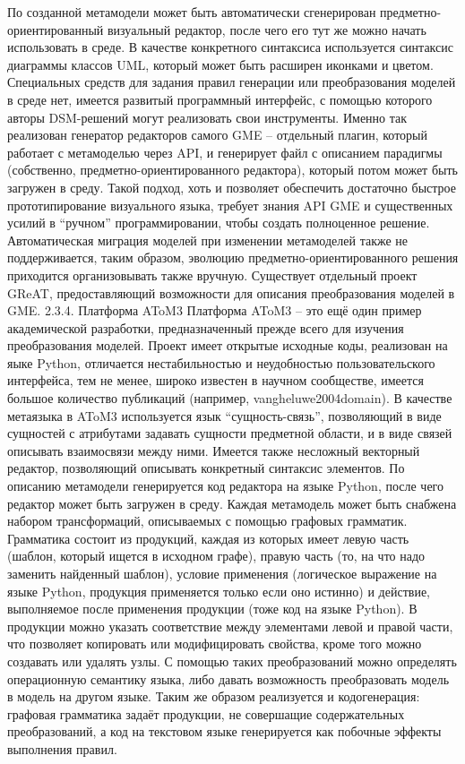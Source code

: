 	По созданной метамодели может быть автоматически сгенерирован предметно-ориентированный визуальный редактор, после чего его тут же можно начать использовать в среде. В качестве конкретного синтаксиса используется синтаксис диаграммы классов UML, который может быть расширен иконками и цветом. Специальных средств для задания правил генерации или преобразования моделей в среде нет, имеется развитый программный интерфейс, с помощью которого авторы DSM-решений могут реализовать свои инструменты. Именно так реализован генератор редакторов самого GME – отдельный плагин, который работает с метамоделью через API, и генерирует файл с описанием парадигмы (собственно, предметно-ориентированного редактора), который потом может быть загружен в среду. Такой подход, хоть и позволяет обеспечить достаточно быстрое прототипирование визуального языка, требует знания API GME и существенных усилий в “ручном” программировании, чтобы создать полноценное решение. Автоматическая миграция моделей при изменении метамоделей также не поддерживается, таким образом, эволюцию предметно-ориентированного решения приходится организовывать также вручную. Существует отдельный проект GReAT, предоставляющий возможности для описания преобразования моделей в GME.
2.3.4. Платформа AToM3
	Платформа AToM3 – это ещё один пример академической разработки, предназначенный прежде всего для изучения преобразования моделей. Проект имеет открытые исходные коды, реализован на яыке Python, отличается нестабильностью и неудобностью пользовательского интерфейса, тем не менее, широко известен в научном сообществе, имеется большое количество публикаций (например, vangheluwe2004domain).
	В качестве метаязыка в AToM3 используется язык “сущность-связь”, позволяющий в виде сущностей с атрибутами задавать сущности предметной области, и в виде связей описывать взаимосвязи между ними. Имеется также несложный векторный редактор, позволяющий описывать конкретный синтаксис элементов. По описанию метамодели генерируется код редактора на языке Python, после чего редактор может быть загружен в среду. 
	Каждая метамодель может быть снабжена набором трансформаций, описываемых с помощью графовых грамматик. Грамматика состоит из продукций, каждая из которых имеет левую часть (шаблон, который ищется в исходном графе), правую часть (то, на что надо заменить найденный шаблон), условие применения (логическое выражение на языке Python, продукция применяется только если оно истинно) и действие, выполняемое после применения продукции (тоже код на языке Python). В продукции можно указать соответствие между элементами левой и правой части, что позволяет копировать или модифицировать свойства, кроме того можно создавать или удалять узлы. С помощью таких преобразований можно определять операционную семантику языка, либо давать возможность преобразовать модель в модель на другом языке. Таким же образом реализуется и кодогенерация: графовая грамматика задаёт продукции, не совершащие содержательных преобразований, а код на текстовом языке генерируется как побочные эффекты выполнения правил.
